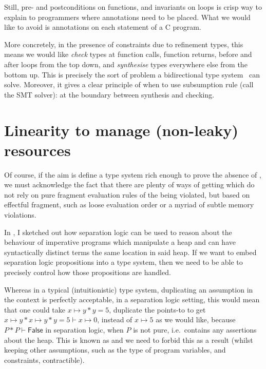 Still, pre- and postconditions on functions, and invariants on loops is crisp
way to explain to programmers where annotations need to be placed. What we
would like to avoid is annotations on each statement of a C program.

More concretely, in the presence of constraints due to refinement types, this
means we would like \emph{check} types at function calls, function returns,
before and after loops from the top down, and \emph{synthesise} types
everywhere else from the bottom up. This is precisely the sort of problem a
bidirectional type system~ can solve. Moreover, it
gives a clear principle of when to use subsumption rule (call the SMT solver):
at the boundary between synthesis and checking.

\section{Linearity to manage (non-leaky) resources}

Of course, if the aim is define a type system rich enough to prove the absence
of , we must acknowledge the fact that there are plenty of ways of
getting  which do not rely on pure fragment evaluation rules of the
 being violated, but based on effectful fragment, such as loose
evaluation order or a myriad of subtle memory violations.

In , I sketched out how separation logic can be
used to reason about the behaviour of imperative programs which manipulate a
heap and can have syntactically distinct terms  the same location
in said heap. If we want to embed separation logic propositions into a type
system, then we need to be able to precisely control how those propositions are
handled.

Whereas in a typical (intuitionistic) type system, duplicating an assumption in
the context is perfectly acceptable, in a separation logic setting, this would
mean that one could take $x \mapsto{} y \ast{} y = 5$, duplicate the points-to
to get $x \mapsto{} y \ast{} x \mapsto{} y \ast y = 5 \vdash{} x \mapsto{} 0$,
instead of $x \mapsto{} 5$ as we would like, because $P \ast{} P \vdash{}
\mathsf{False}$ in separation logic, when $P$ is not pure, i.e.\ contains any
assertions about the heap. This is known as  and we need to
forbid this as a result (whilst keeping other assumptions, such as the type of
 program variables, and constraints, contractible).

